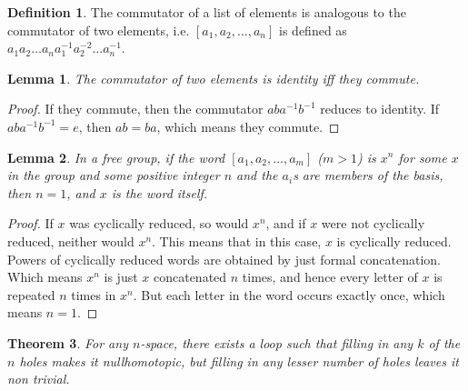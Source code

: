\documentclass[12pt, titlepage]{article}
\newtheorem{thm}{Theorem}[section]
\newtheorem{lem}[thm]{Lemma}
\theoremstyle{definition}
\newtheorem{defn}{Definition}[section]
\begin{document}
\begin{defn}
The commutator of a list of elements is analogous to the commutator of two elements, i.e. $[a_1, a_2, \ldots, a_n]$ is defined as $a_1a_2\ldots a_na_1^{-1}a_2^{-2}\ldots a_n^{-1}$.
\end{defn}

\begin{lem}
The commutator of two elements is identity iff they commute.
\end{lem}

\begin{proof}
If they commute, then the commutator $aba^{-1}b^{-1}$ reduces to identity. If $aba^{-1}b^{-1}=e$, then $ab=ba$, which means they commute. 
\end{proof}

\begin{lem}\label{impo2}
In a free group, if the word $[a_1, a_2, \ldots, a_m]$ ($m>1$) is $x^n$ for some $x$ in the group and some positive integer $n$ and the $a_i$s are members of the basis, then $n=1$, and $x$ is the word itself.
\end{lem}

\begin{proof}
If $x$ was cyclically reduced, so would $x^n$, and if $x$ were not cyclically reduced, neither would $x^n$. This means that in this case, $x$ is cyclically reduced. Powers of cyclically reduced words are obtained by just formal concatenation. Which means $x^n$ is just $x$ concatenated $n$ times, and hence every letter of $x$ is repeated $n$ times in $x^n$. But each letter in the word occurs exactly once, which means $n=1$.
\end{proof}

\begin{thm}
For any $n$-space, there exists a loop such that filling in any $k$ of the $n$ holes makes it \emph{nullhomotopic}, but filling in any lesser number of holes leaves it non trivial.
\end{thm}
\end{document}
